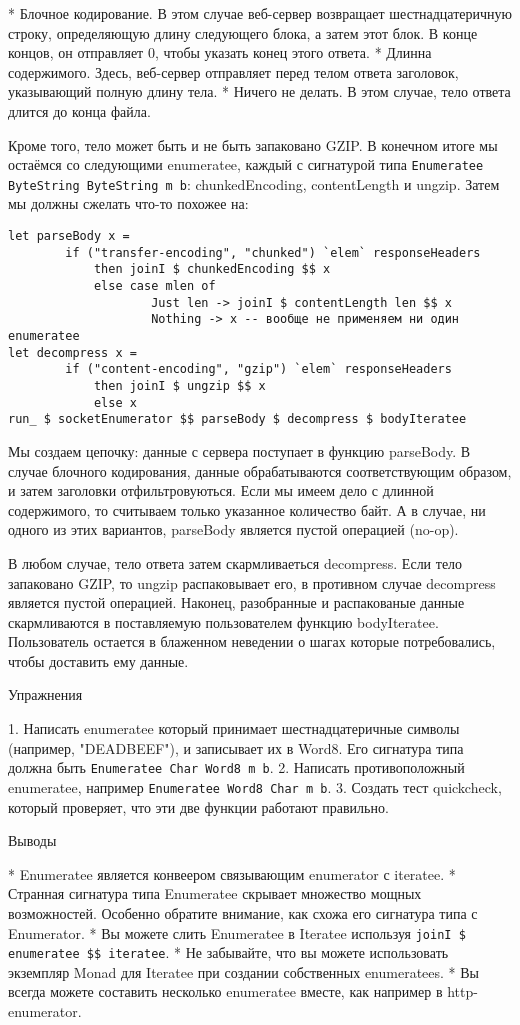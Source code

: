 * Блочное кодирование. В этом случае веб-сервер возвращает шестнадцатеричную строку, определяющую длину следующего блока, а затем этот блок. В конце концов, он отправляет 0, чтобы указать конец этого ответа.
* Длинна содержимого. Здесь, веб-сервер отправляет перед телом ответа заголовок, указывающий полную длину тела.
* Ничего не делать. В этом случае, тело ответа длится до конца файла.

Кроме того, тело может быть и не быть запаковано GZIP. В конечном итоге мы остаёмся со следующими enumeratee, каждый с сигнатурой типа \lstinline'Enumeratee ByteString ByteString m b': chunkedEncoding, contentLength и ungzip. Затем мы должны сжелать что-то похожее на:

\begin{lstlisting}
let parseBody x =
        if ("transfer-encoding", "chunked") `elem` responseHeaders
            then joinI $ chunkedEncoding $$ x
            else case mlen of
                    Just len -> joinI $ contentLength len $$ x
                    Nothing -> x -- вообще не применяем ни один enumeratee
let decompress x =
        if ("content-encoding", "gzip") `elem` responseHeaders
            then joinI $ ungzip $$ x
            else x
run_ $ socketEnumerator $$ parseBody $ decompress $ bodyIteratee
\end{lstlisting}

Мы создаем цепочку: данные с сервера поступает в функцию parseBody. В случае блочного кодирования, данные обрабатываются соответствующим образом, и затем заголовки отфильтровуються. Если мы имеем дело с длинной содержимого, то считываем только указанное количество байт. А в случае, ни одного из этих вариантов, parseBody является пустой операцией (no-op).

В любом случае, тело ответа затем скармливаеться decompress. Если тело запаковано GZIP, то ungzip распаковывает его, в противном случае decompress является пустой операцией. Наконец, разобранные и распакованые данные скармливаются в поставляемую пользователем функцию bodyIteratee. Пользователь остается в блаженном неведении о шагах которые потребовались, чтобы доставить ему данные.

Упражнения

1. Написать enumeratee который принимает шестнадцатеричные символы (например, "DEADBEEF"), и записывает их в Word8. Его сигнатура типа должна быть \lstinline'Enumeratee Char Word8 m b'.
2. Написать противоположный enumeratee, например \lstinline'Enumeratee Word8 Char m b'.
3. Создать тест quickcheck, который проверяет, что эти две функции работают правильно.

Выводы

* Enumeratee является конвеером связывающим enumerator с iteratee.
* Странная сигнатура типа Enumeratee скрывает множество мощных возможностей. Особенно обратите внимание, как схожа его сигнатура типа с Enumerator.
* Вы можете слить Enumeratee в Iteratee используя \lstinline'joinI $ enumeratee $$ iteratee'.
* Не забывайте, что вы можете использовать экземпляр Monad для Iteratee при создании собственных enumeratees.
* Вы всегда можете составить несколько enumeratee вместе, как например в http-enumerator.

